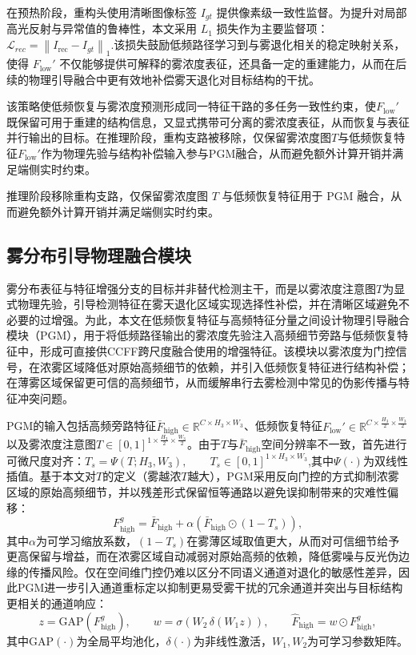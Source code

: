 在预热阶段，重构头使用清晰图像标签 $I_{gt}$ 提供像素级一致性监督。为提升对局部高光反射与异常值的鲁棒性，本文采用 $L_1$ 损失作为主要监督项：$\mathcal{L}_{rec}=\left\|I_{\mathrm{rec}}-I_{gt}\right\|_{1}$.该损失鼓励低频路径学习到与雾退化相关的稳定映射关系，使得 $F_{\mathrm{low}}'$ 不仅能够提供可解释的雾浓度表征，还具备一定的重建能力，从而在后续的物理引导融合中更有效地补偿雾天退化对目标结构的干扰。

该策略使低频恢复与雾浓度预测形成同一特征干路的多任务一致性约束，使$F_{\mathrm{low}}'$既保留可用于重建的结构信息，又显式携带可分离的雾浓度表征，从而恢复与表征并行输出的目标。在推理阶段，重构支路被移除，仅保留雾浓度图$T$与低频恢复特征$F_{\mathrm{low}}'$作为物理先验与结构补偿输入参与PGM融合，从而避免额外计算开销并满足端侧实时约束。

推理阶段移除重构支路，仅保留雾浓度图 $T$ 与低频恢复特征用于 PGM 融合，从而避免额外计算开销并满足端侧实时约束。



\subsection{雾分布引导物理融合模块}
\label{subsec:pgm}

雾分布表征与特征增强分支的目标并非替代检测主干，而是以雾浓度注意图$T$为显式物理先验，引导检测特征在雾天退化区域实现选择性补偿，并在清晰区域避免不必要的过增强。为此，本文在低频恢复特征与高频特征分量之间设计物理引导融合模块（PGM），用于将低频路径输出的雾浓度先验注入高频细节旁路与低频恢复特征中，形成可直接供CCFF跨尺度融合使用的增强特征。该模块以雾浓度为门控信号，在浓雾区域降低对原始高频细节的依赖，并引入低频恢复特征进行结构补偿；在薄雾区域保留更可信的高频细节，从而缓解串行去雾检测中常见的伪影传播与特征冲突问题。

PGM的输入包括高频旁路特征$\bar{F}_{\mathrm{high}}\in\mathbb{R}^{C\times H_3\times W_3}$、低频恢复特征$F_{\mathrm{low}}'\in\mathbb{R}^{C\times \frac{H_3}{2}\times \frac{W_3}{2}}$以及雾浓度注意图$T\in[0,1]^{1\times \frac{H_3}{2}\times \frac{W_3}{2}}$。由于$T$与$\bar{F}_{\mathrm{high}}$空间分辨率不一致，首先进行可微尺度对齐：$T_s=\Psi(T;H_3,W_3),\qquad T_s\in[0,1]^{1\times H_3\times W_3}$,其中$\Psi(\cdot)$为双线性插值。基于本文对$T$的定义（雾越浓$T$越大），PGM采用反向门控的方式抑制浓雾区域的原始高频细节，并以残差形式保留恒等通路以避免误抑制带来的灾难性偏移：
\begin{equation}
F_{\mathrm{high}}^{g}=\bar{F}_{\mathrm{high}}+\alpha\left(\bar{F}_{\mathrm{high}}\odot (1-T_s)\right),
\label{eq:pgm_spatial_gate}
\end{equation}
其中$\alpha$为可学习缩放系数，$(1-T_s)$在雾薄区域取值更大，从而对可信细节给予更高保留与增益，而在浓雾区域自动减弱对原始高频的依赖，降低雾噪与反光伪边缘的传播风险。仅在空间维门控仍难以区分不同语义通道对退化的敏感性差异，因此PGM进一步引入通道重标定以抑制更易受雾干扰的冗余通道并突出与目标结构更相关的通道响应：
\begin{equation}
z=\mathrm{GAP}(F_{\mathrm{high}}^{g}),\qquad
w=\sigma\!\left(W_2\,\delta\!\left(W_1 z\right)\right),\qquad
\hat{F}_{\mathrm{high}}=w\odot F_{\mathrm{high}}^{g},
\label{eq:pgm_channel}
\end{equation}
其中$\mathrm{GAP}(\cdot)$为全局平均池化，$\delta(\cdot)$为非线性激活，$W_1,W_2$为可学习参数矩阵。

